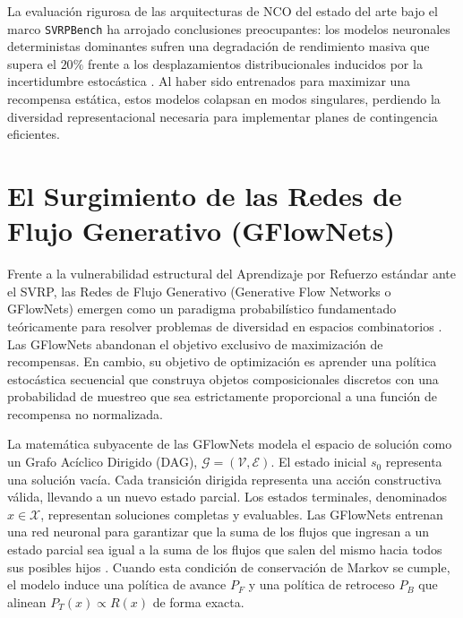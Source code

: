 \documentclass[12pt]{report}
\begin{document}
La evaluaci\'on rigurosa de las arquitecturas de NCO del estado del arte bajo el marco \texttt{SVRPBench} ha arrojado conclusiones preocupantes: los modelos neuronales deterministas dominantes sufren una degradaci\'on de rendimiento masiva que supera el $20\%$ frente a los desplazamientos distribucionales inducidos por la incertidumbre estoc\'astica \cite{Heakl2025SVRP}. Al haber sido entrenados para maximizar una recompensa est\'atica, estos modelos colapsan en modos singulares, perdiendo la diversidad representacional necesaria para implementar planes de contingencia eficientes.

\chapter*{El Surgimiento de las Redes de Flujo Generativo (GFlowNets)}

Frente a la vulnerabilidad estructural del Aprendizaje por Refuerzo est\'andar ante el SVRP, las Redes de Flujo Generativo (Generative Flow Networks o GFlowNets) emergen como un paradigma probabil\'istico fundamentado te\'oricamente para resolver problemas de diversidad en espacios combinatorios \cite{Bengio2023Foundations}. Las GFlowNets abandonan el objetivo exclusivo de maximizaci\'on de recompensas. En cambio, su objetivo de optimizaci\'on es aprender una pol\'itica estoc\'astica secuencial que construya objetos composicionales discretos con una probabilidad de muestreo que sea estrictamente proporcional a una funci\'on de recompensa no normalizada.

La matem\'atica subyacente de las GFlowNets modela el espacio de soluci\'on como un Grafo Ac\'iclico Dirigido (DAG), $\mathcal{G} = (\mathcal{V}, \mathcal{E})$. El estado inicial $s_0$ representa una soluci\'on vac\'ia. Cada transici\'on dirigida representa una acci\'on constructiva v\'alida, llevando a un nuevo estado parcial. Los estados terminales, denominados $x \in \mathcal{X}$, representan soluciones completas y evaluables. Las GFlowNets entrenan una red neuronal para garantizar que la suma de los flujos que ingresan a un estado parcial sea igual a la suma de los flujos que salen del mismo hacia todos sus posibles hijos \cite{Bengio2023Foundations}. Cuando esta condici\'on de conservaci\'on de Markov se cumple, el modelo induce una pol\'itica de avance $P_F$ y una pol\'itica de retroceso $P_B$ que alinean $P_T(x) \propto R(x)$ de forma exacta.
\end{document}

